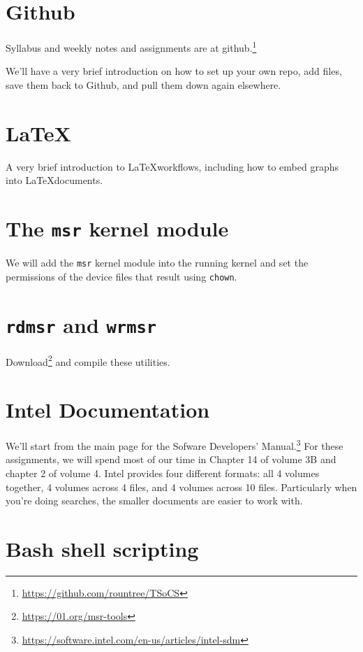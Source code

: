 \documentclass{tufte-handout}
\begin{document}
\section{Github}

Syllabus and weekly notes and assignments are at github.\footnote{\url{https://github.com/rountree/TSoCS}}

We'll have a very brief introduction on how to set up your own repo, add files, save them back to Github,
and pull them down again elsewhere.

\section{\LaTeX}

A very brief introduction to \LaTeX workflows, including how to embed graphs into
\LaTeX documents.

\section{The \texttt{msr} kernel module}

We will add the \texttt{msr} kernel module into the running kernel and set the permissions of the device
files that result using \texttt{chown}.

\section{\texttt{rdmsr} and \texttt{wrmsr}}

Download\footnote{\url{https://01.org/msr-tools}} and compile these utilities.

\section{Intel Documentation}

We'll start from the main page for the Sofware Developers' Manual.\footnote{\url{https://software.intel.com/en-us/articles/intel-sdm}}
For these assignments, we will spend most of our time in Chapter 14 of volume 3B and chapter 2 of volume 4.
Intel provides four different formats:  all 4 volumes together, 4 volumes across 4 files, and 4 volumes across 10 files.
Particularly when you're doing searches, the smaller documents are easier to work with.

\section{Bash shell scripting}
\end{document}
